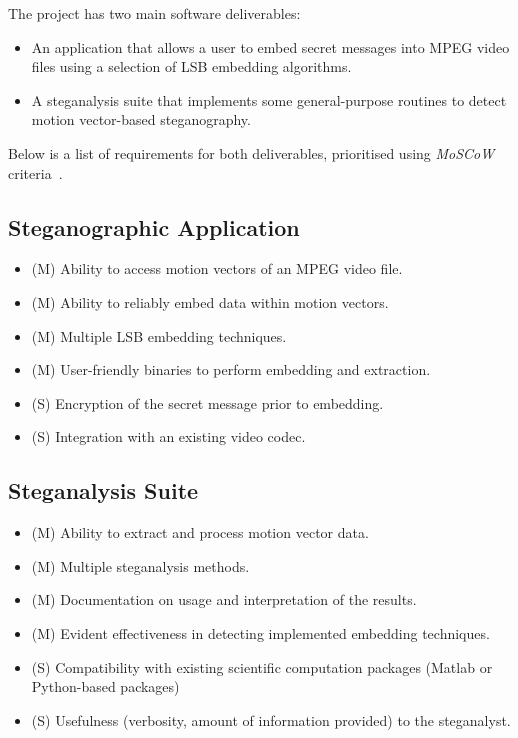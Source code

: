 \documentclass[12pt,british,twoside,notitlepage,usenames,dvipsnames,hypens,final]{report}
\numberwithin{equation}{section}
\numberwithin{figure}{section}
\begin{document}
The project has two main software deliverables:
\begin{itemize}
\item  An application that allows a user to embed secret messages into MPEG video files using a selection of LSB embedding algorithms.
\item A steganalysis suite that implements some general-purpose routines to detect motion vector-based steganography.
\end{itemize}

Below is a list of requirements for both deliverables, prioritised using \emph{MoSCoW} criteria~\cite{softid-notes}.

\subsection{Steganographic Application}
\label{req-steg-app}
\begin{itemize}
\item (M) Ability to access motion vectors of an MPEG video file.
\item (M) Ability to reliably embed data within motion vectors.
\item (M) Multiple LSB embedding techniques.
\item (M) User-friendly binaries to perform embedding and extraction.
\item (S) Encryption of the secret message prior to embedding.
\item (S) Integration with an existing video codec.
\end{itemize}

\subsection{Steganalysis Suite}
\label{req-steg-suite}
\begin{itemize}
\item (M) Ability to extract and process motion vector data.
\item (M) Multiple steganalysis methods.
\item (M) Documentation on usage and interpretation of the results.
\item (M) Evident effectiveness in detecting implemented embedding techniques.
\item (S) Compatibility with existing scientific computation packages (Matlab or Python-based packages)
\item (S) Usefulness (verbosity, amount of information provided) to the steganalyst.
\end{itemize}
\end{document}
